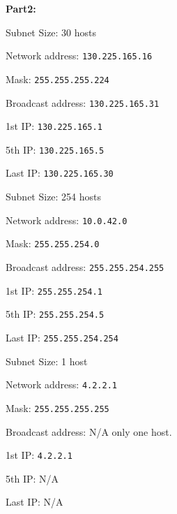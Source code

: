 \documentclass[10pt]{article}
\begin{document}
\noindent \textbf{Part2:}\\
\begin{enumerate*}
  \item \begin{itemize*}
          \item Subnet Size: 30 hosts
          \item Network address: \texttt{130.225.165.16}
          \item Mask: \texttt{255.255.255.224}
          \item Broadcast address: \texttt{130.225.165.31}
          \item 1st IP: \texttt{130.225.165.1}
          \item 5th IP: \texttt{130.225.165.5}
          \item Last IP: \texttt{130.225.165.30}
        \end{itemize*}

  \item \begin{itemize*}
          \item Subnet Size: 254 hosts
          \item Network address: \texttt{10.0.42.0}
          \item Mask: \texttt{255.255.254.0}
          \item Broadcast address: \texttt{255.255.254.255}
          \item 1st IP: \texttt{255.255.254.1}
          \item 5th IP: \texttt{255.255.254.5}
          \item Last IP: \texttt{255.255.254.254}
        \end{itemize*}

  \item \begin{itemize*}
          \item Subnet Size: 1 host
          \item Network address: \texttt{4.2.2.1}
          \item Mask: \texttt{255.255.255.255}
          \item Broadcast address: N/A only one host.
          \item 1st IP: \texttt{4.2.2.1}
          \item 5th IP: N/A
          \item Last IP: N/A
        \end{itemize*}


\end{enumerate*}
\end{document}
